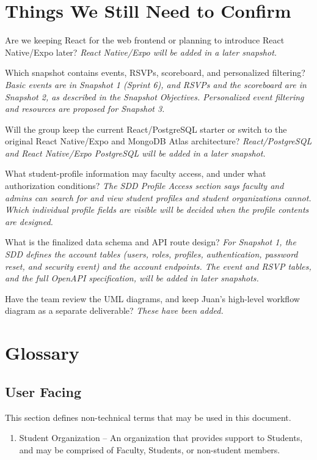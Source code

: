\section{Things We Still Need to Confirm}
	\begin{todolist}[leftmargin=3\parindent]
		\item \done Are we keeping React for the web frontend or planning to introduce React Native/Expo later? \textit{React Native/Expo will be added in a later snapshot.}
		\item \done Which snapshot contains events, RSVPs, scoreboard, and personalized filtering? \textit{Basic events are in Snapshot 1 (Sprint 6), and RSVPs and the scoreboard are in Snapshot 2, as described in the Snapshot Objectives. Personalized event filtering and resources are proposed for Snapshot 3.}
		\item \done Will the group keep the current React/PostgreSQL starter or switch to the original React Native/Expo and MongoDB Atlas architecture? \textit{React/PostgreSQL and React Native/Expo PostgreSQL will be added in a later snapshot.}
		\item \done What student-profile information may faculty access, and under what authorization conditions? \textit{The SDD Profile Access section says faculty and admins can search for and view student profiles and student organizations cannot. Which individual profile fields are visible will be decided when the profile contents are designed.}
		\item \done What is the finalized data schema and API route design? \textit{For Snapshot 1, the SDD defines the account tables (users, roles, profiles, authentication, password reset, and security event) and the account endpoints. The event and RSVP tables, and the full OpenAPI specification, will be added in later snapshots.}
		\item \done Have the team review the UML diagrams, and keep Juan's high-level workflow diagram as a separate deliverable? \textit{These have been added.}
	\end{todolist}


\newpage %
\section{Glossary}
	\subsection{User Facing}
	This section defines non-technical terms that may be used in this document.
	\begin{enumerate}[leftmargin=3\parindent]
		\item Student Organization -- An organization that provides support to Students, and may be comprised of Faculty, Students, or non-student members.
	\end{enumerate}

